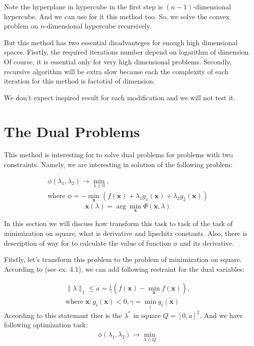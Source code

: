 \documentclass[12pt]{article}
\begin{document}
Note the hyperplane in hypercube in the first step is $(n-1)$-dimensional hypercube. And we can use for it this method too. So, we solve the convex problem on $n$-dimensional hypercube recursively.

But this method has two essential disadvanteges for enough high dimensional spaces. Fisrtly, the required iterations number depend on logarithm of dimension. Of course, it is essential only for very high dimensional problems. Secondly, recursive algorithm will be extra slow because each the complexity of each iteration for this method is factotial of dimension.

We don't expect inspired result for each modification and we will not test it.

\section{The Dual Problems}
\label{details}

This method is interesting for to solve dual problems for problems with two constraints. Namely, we are interesting in solution of the following problem:

\begin{gather}
\phi(\lambda_1, \lambda_2) \rightarrow \min_{\lambda\geq 0},\\
\text{where } \phi = -\min_\textbf{x}\left(f(\textbf{x}) + \lambda_1 g_1(\textbf{x}) + \lambda_2 g_2(\textbf{x})\right)
\end{gather}
$$\textbf{x}(\lambda) = \arg\min_\textbf{x}\Phi(\textbf{x}, \lambda)$$

In this section we will discuss how transform this task to task of the task of minimization on square, what is derivative and lipschitz constants. Also, there is description of way for to calculate the value of function $\phi$ and its derivative.

Fitstly, let's transform this problem to the problem of minimization on square. According to \cite{task} (see ex. 4.1), we can add following restraint for the dual variables:

\begin{gather}
\label{restr:dual}
\|{\lambda}\|_1 \leq a = \frac{1}{\gamma}\left(f(\overline{\textbf{x}}) -\min\limits_{\textbf{x}}f(\textbf{x})\right),\\
\text{where $\overline{\textbf{x}}:g_i(\overline{\textbf{x}})<0,\gamma = \min\limits_ig_i(\overline{\textbf{x}})$}
\end{gather}
According to this statemant ther is the $\lambda^*$ in square $Q = [0, a]^2$. And we have following optimization task:
\begin{gather}
\label{dual}
\phi(\lambda_1, \lambda_2) \rightarrow \min_{\lambda \in Q}
\end{gather}
\end{document}
